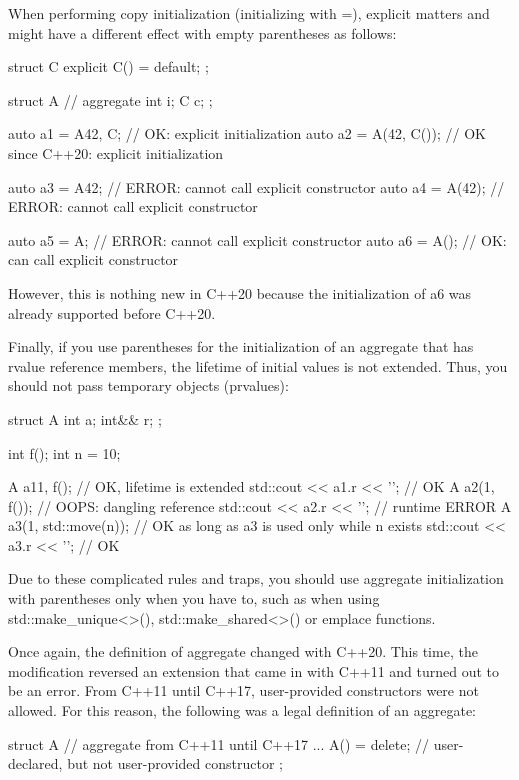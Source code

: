 When performing copy initialization (initializing with =), explicit matters and might have a different effect with empty parentheses as follows:

\begin{cpp}
struct C {
	explicit C() = default;
};

struct A { // aggregate
	int i;
	C c;
};

auto a1 = A{42, C{}}; // OK: explicit initialization
auto a2 = A(42, C()); // OK since C++20: explicit initialization

auto a3 = A{42}; // ERROR: cannot call explicit constructor
auto a4 = A(42); // ERROR: cannot call explicit constructor

auto a5 = A{}; // ERROR: cannot call explicit constructor
auto a6 = A(); // OK: can call explicit constructor
\end{cpp}

However, this is nothing new in C++20 because the initialization of a6 was already supported before C++20.

Finally, if you use parentheses for the initialization of an aggregate that has rvalue reference members, the lifetime of initial values is not extended. Thus, you should not pass temporary objects (prvalues):

\begin{cpp}
struct A {
	int a;
	int&& r;
};

int f();
int n = 10;

A a1{1, f()}; // OK, lifetime is extended
std::cout << a1.r << '\n'; // OK
A a2(1, f()); // OOPS: dangling reference
std::cout << a2.r << '\n'; // runtime ERROR
A a3(1, std::move(n)); // OK as long as a3 is used only while n exists
std::cout << a3.r << '\n'; // OK
\end{cpp}

Due to these complicated rules and traps, you should use aggregate initialization with parentheses only when you have to, such as when using std::make\_unique<>(), std::make\_shared<>() or emplace functions.


Once again, the definition of aggregate changed with C++20. This time, the modification reversed an extension that came in with C++11 and turned out to be an error. From C++11 until C++17, user-provided constructors were not allowed. For this reason, the following was a legal definition of an aggregate:

\begin{cpp}
struct A { // aggregate from C++11 until C++17
	...
	A() = delete; // user-declared, but not user-provided constructor
};
\end{cpp}

